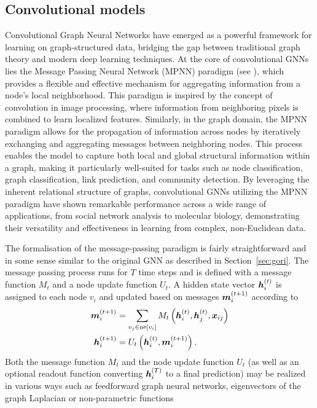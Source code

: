 \subsection{Convolutional models}

Convolutional Graph Neural Networks have emerged as a powerful framework for learning on graph-structured data, bridging the gap between traditional graph theory and modern deep learning techniques. At the core of convolutional GNNs lies the Message Passing Neural Network (MPNN) paradigm (see \cite{gilmer_neural_2017}), which provides a flexible and effective mechanism for aggregating information from a node's local neighborhood. This paradigm is inspired by the concept of convolution in image processing, where information from neighboring pixels is combined to learn localized features. Similarly, in the graph domain, the MPNN paradigm allows for the propagation of information across nodes by iteratively exchanging and aggregating messages between neighboring nodes. This process enables the model to capture both local and global structural information within a graph, making it particularly well-suited for tasks such as node classification, graph classification, link prediction, and community detection. By leveraging the inherent relational structure of graphs, convolutional GNNs utilizing the MPNN paradigm have shown remarkable performance across a wide range of applications, from social network analysis to molecular biology, demonstrating their versatility and effectiveness in learning from complex, non-Euclidean data.

The formalisation of the message-passing paradigm is fairly straightforward and in some sense similar to the original GNN as described in Section~\ref{sec:gori}. The message passing process runs for \( T \) time steps and is defined with a message function \( M_t \) and a node update function \( U_t \). A hidden state vector \( \bm{h}_i^{(t)} \) is assigned to each node \( v_i \) and updated based on messages \( \bm{m}_i^{(t+1)} \) according to
\begin{equation}\label{eq:message-passing}
	\begin{split}
		\bm{m}_i^{(t+1)} &= \sum_{v_j \in \mathrm{ne}[v_i]} M_t \left( \bm{h}_i^{(t)}, \bm{h}_j^{(t)}, \bm{x}_{ij} \right) \\
		\bm{h}_i^{(t+1)} &= U_t \left( \bm{h}_i^{(t)}, \bm{m}_i^{(t+1)} \right). \\
	\end{split}
\end{equation}
Both the message function \( M_t \) and the node update function \( U_t \) (as well as an optional readout function converting \( \bm{h}_i^{(T)} \) to a final prediction) may be realized in various ways such as feedforward graph neural networks, eigenvectors of the graph Laplacian or non-parametric functions

